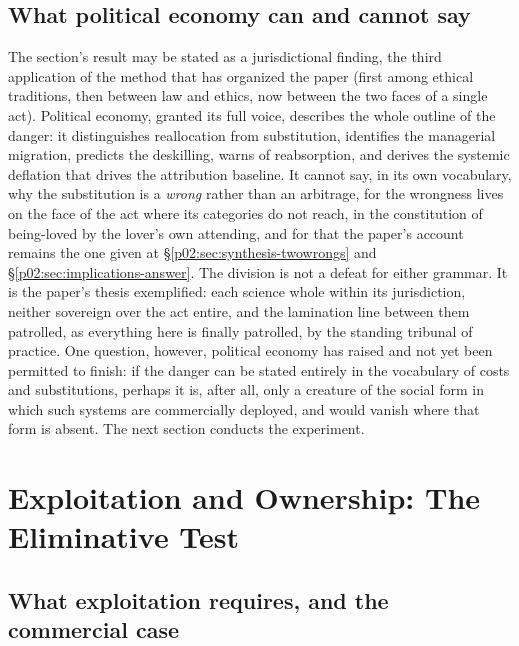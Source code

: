 \documentclass[11pt,a4paper]{article}
\begin{document}
\subsection{What political economy can and cannot say}
\label{p02:sec:pe-verdict}

The section's result may be stated as a jurisdictional finding, the third application of the method that has organized the paper (first among ethical traditions, then between law and ethics, now between the two faces of a single act). Political economy, granted its full voice, describes the whole outline of the danger: it distinguishes reallocation from substitution, identifies the managerial migration, predicts the deskilling, warns of reabsorption, and derives the systemic deflation that drives the attribution baseline. It cannot say, in its own vocabulary, why the substitution is a \emph{wrong} rather than an arbitrage, for the wrongness lives on the face of the act where its categories do not reach, in the constitution of being-loved by the lover's own attending, and for that the paper's account remains the one given at \S\ref{p02:sec:synthesis-twowrongs} and \S\ref{p02:sec:implications-answer}. The division is not a defeat for either grammar. It is the paper's thesis exemplified: each science whole within its jurisdiction, neither sovereign over the act entire, and the lamination line between them patrolled, as everything here is finally patrolled, by the standing tribunal of practice. One question, however, political economy has raised and not yet been permitted to finish: if the danger can be stated entirely in the vocabulary of costs and substitutions, perhaps it is, after all, only a creature of the social form in which such systems are commercially deployed, and would vanish where that form is absent. The next section conducts the experiment.

\section{Exploitation and Ownership: The Eliminative Test}
\label{p02:sec:exploitation}

\subsection{What exploitation requires, and the commercial case}
\label{p02:sec:ex-structure}
\end{document}
